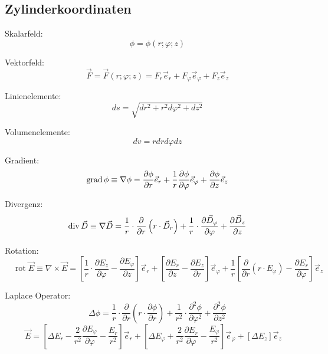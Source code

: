 \subsection{Zylinderkoordinaten}
\begin{description}
      \item Skalarfeld:
            \[
                  \quad \phi = \phi(r;\varphi;z)
            \]
      \item Vektorfeld:
            \[
                  \quad \vec{F} = \vec{F}(r;\varphi;z) = F_r\vec{e}_r+F_\varphi\vec{e}_\varphi+F_z\vec{e}_z
            \]
      \item Linienelemente:
            \[
                  \quad d s=\sqrt{d r^{2}+r^{2} d \varphi^{2}+d z^{2}}
            \]
      \item Volumenelemente:
            \[
                  \quad d v=r d r d \varphi d z
            \]
      \item Gradient:
            \[
                  \quad \operatorname{grad} \phi \equiv \nabla \phi=\frac{\partial \phi}{\partial r} \vec{e}_r
                  +\frac{1}{r} \frac{\partial \phi}{\partial \varphi} \vec{e}_\varphi
                  +\frac{\partial \phi}{\partial z} \vec{e}_z
            \]
      \item Divergenz:
            \[
                  \quad \operatorname{div} \vec{D} \equiv \nabla \vec{D}=\frac{1}{r}\cdot\frac{\partial}{\partial r}\left(r\cdot\vec{D}_{r}\right)
                  +\frac{1}{r}\cdot\frac{\partial \vec{D}_{\varphi}}{\partial \varphi}
                  +\frac{\partial \vec{D}_{z}}{\partial z}
            \]
      \item Rotation:
            \[
                  \quad \operatorname{rot} \vec{E} \equiv \nabla \times \vec{E}=
                  \left[\frac{1}{r}\cdot\frac{\partial E_z}{\partial \varphi}-\frac{\partial E_\varphi}{\partial z}\right] \vec{e}_r
                  +\left[\frac{\partial E_r}{\partial z}-\frac{\partial E_z}{\partial r}\right] \vec{e}_\varphi
                  +\frac{1}{r}\left[\frac{\partial}{\partial r}\left(r\cdot E_\varphi\right)-\frac{\partial E_r}{\partial \varphi}\right] \vec{e}_z
            \]
      \item Laplace Operator:
            \[
                  \quad \Delta\phi
                  = \frac{1}{r}\cdot\frac{\partial }{\partial r}\left(r\cdot\frac{\partial\phi}{\partial r}\right)
                  + \frac{1}{r^2}\cdot\frac{\partial^2 \phi}{\partial \varphi^2}
                  + \frac{\partial^2 \phi}{\partial z^2}
            \]
            \[
                  \vec{E} =  \left[\Delta E_r-\frac{2}{r^{2}} \frac{\partial E_\varphi}{\partial \varphi}-\frac{E_r}{r^{2}}\right] \vec{e}_r
                  +\left[\Delta E_\varphi+\frac{2}{r^{2}} \frac{\partial E_r}{\partial \varphi}-\frac{E_\varphi}{r^{2}}\right] \vec{e}_\varphi+\left[\Delta E_z\right] \vec{e}_z
            \]
\end{description}


